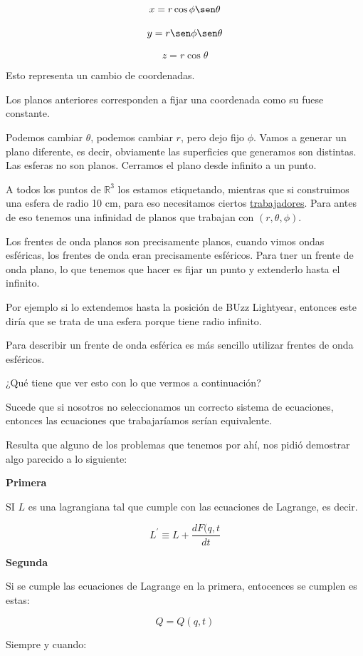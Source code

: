 \documentclass{article}
\begin{document}
\[  x = r\cos\phi\sen\theta  \]


\[ y= r\sen\phi\sen\theta \]

\[ z = r\cos\theta \]

Esto representa un cambio de coordenadas. 

Los planos anteriores corresponden a fijar una coordenada como su fuese constante. 


Podemos cambiar $\theta$, podemos cambiar $r$, pero dejo fijo $\phi$. Vamos a generar un plano diferente, es decir, obviamente las superficies que generamos son distintas. Las esferas no son planos. Cerramos el plano desde infinito a un punto. 


A todos los puntos de $\mathbb{R}^{3}$ los estamos etiquetando, mientras que si construimos una esfera de radio 10 cm, para eso necesitamos ciertos \underline{trabajadores}. Para antes de eso tenemos una infinidad de planos que trabajan con $(r,\theta, \phi)$.

Los frentes de onda planos son precisamente planos, cuando vimos ondas esféricas, los frentes de onda eran precisamente esféricos. Para tner un frente de onda plano, lo que tenemos que hacer es fijar un punto y extenderlo hasta el infinito. 


Por ejemplo si lo extendemos hasta la posición de BUzz Lightyear, entonces este diría que se trata de una esfera porque tiene radio infinito.


Para describir un frente de onda esférica es más sencillo utilizar frentes de onda esféricos. 

¿Qué tiene que ver esto con lo que vermos a continuación?

Sucede que si nosotros no seleccionamos un correcto sistema de ecuaciones, entonces las ecuaciones que trabajaríamos serían equivalente. 

Resulta que alguno de los problemas que tenemos por ahí, nos pidió demostrar algo parecido a lo siguiente:

\textbf{Primera}

SI $L$ es una lagrangiana tal que cumple con las ecuaciones de Lagrange, es decir.

\[   L^{\prime} \equiv L + \frac{ dF(q,t  }{dt}  \]

\textbf{Segunda}

Si se cumple las ecuaciones de Lagrange en la primera, entocences se cumplen es estas:


\[ Q=Q(q,t)  \]

Siempre y cuando:
\end{document}
